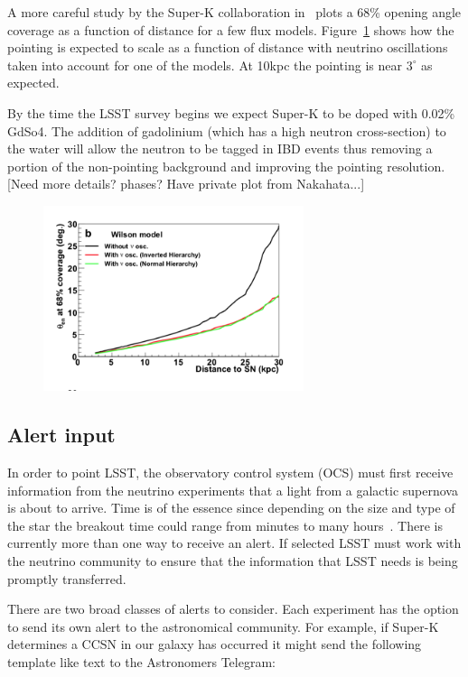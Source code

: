 \documentclass[12pt, letterpaper]{article}
\newcommand{\superk}  {Super\nobreakdash-K\xspace}
\begin{document}
A more careful study by the \superk collaboration
in~\cite{2016APh....81...39A} plots a 68\% opening angle coverage as a
function of distance for a few flux
models. Figure~\ref{fig:SK-realtime-pointing-resolution} shows how the
pointing is expected to scale as a function of distance with neutrino
oscillations taken into account for one of the models. At 10kpc the
pointing is near $3^\circ$ as expected.

By the time the LSST survey begins we expect \superk to be doped with
0.02\% GdSo4.  The addition of gadolinium (which has a high neutron
cross-section) to the water will allow the neutron to be tagged in IBD
events thus removing a portion of the non-pointing background and
improving the pointing resolution. [Need more details? phases? Have
private plot from Nakahata...]

\begin{figure}
  \begin{center}
    \includegraphics[width=3.0in]{SK-realtime-pointing-resolution}
    \caption{}
    \label{fig:SK-realtime-pointing-resolution}
  \end{center}
\end{figure}

\subsection{Alert input}

In order to point LSST, the observatory control system (OCS) must
first receive information from the neutrino experiments that a light
from a galactic supernova is about to arrive.  Time is of the essence
since depending on the size and type of the star the breakout time
could range from minutes to many hours~\cite{2013ApJ...778...81K}.
There is currently more than one way to receive an alert. If selected
LSST must work with the neutrino community to ensure that the
information that LSST needs is being promptly transferred.

There are two broad classes of alerts to consider.  Each experiment
has the option to send its own alert to the astronomical community.
For example, if \superk determines a CCSN in our galaxy has occurred
it might send the following template like text to the Astronomers
Telegram:
\end{document}
